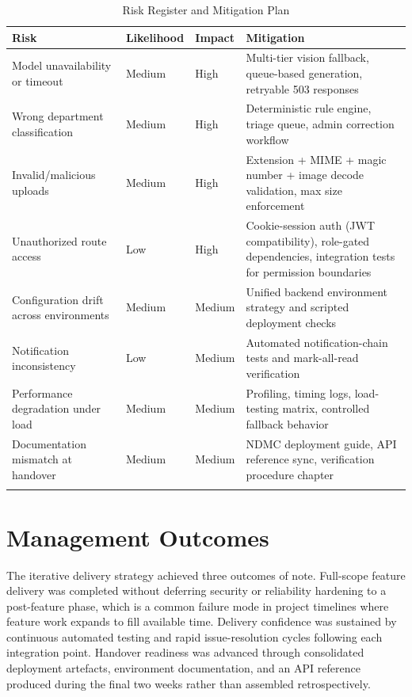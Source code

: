 \begin{xltabular}{\textwidth}{|>{\RaggedRight\arraybackslash}X|>{\RaggedRight\arraybackslash}p{0.15\textwidth}|>{\RaggedRight\arraybackslash}p{0.15\textwidth}|>{\RaggedRight\arraybackslash}X|}
\hline
\textbf{Risk} & \textbf{Likelihood} & \textbf{Impact} & \textbf{Mitigation} \\ \hline
\endhead
Model unavailability or timeout & Medium & High & Multi-tier vision fallback, queue-based generation, retryable 503 responses \\ \hline
Wrong department classification & Medium & High & Deterministic rule engine, triage queue, admin correction workflow \\ \hline
Invalid/malicious uploads & Medium & High & Extension + MIME + magic number + image decode validation, max size enforcement \\ \hline
Unauthorized route access & Low & High & Cookie-session auth (JWT compatibility), role-gated dependencies, integration tests for permission boundaries \\ \hline
Configuration drift across environments & Medium & Medium & Unified backend environment strategy and scripted deployment checks \\ \hline
Notification inconsistency & Low & Medium & Automated notification-chain tests and mark-all-read verification \\ \hline
Performance degradation under load & Medium & Medium & Profiling, timing logs, load-testing matrix, controlled fallback behavior \\ \hline
Documentation mismatch at handover & Medium & Medium & NDMC deployment guide, API reference sync, verification procedure chapter \\ \hline
\caption{Risk Register and Mitigation Plan}
\end{xltabular}

\section{Management Outcomes}

The iterative delivery strategy achieved three outcomes of note. Full-scope feature delivery was completed without deferring security or reliability hardening to a post-feature phase, which is a common failure mode in project timelines where feature work expands to fill available time. Delivery confidence was sustained by continuous automated testing and rapid issue-resolution cycles following each integration point. Handover readiness was advanced through consolidated deployment artefacts, environment documentation, and an API reference produced during the final two weeks rather than assembled retrospectively.




